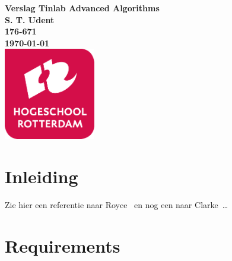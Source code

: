 \documentclass{article}
\begin{document}
\sffamily
\begin{titlepage}
  \centering
    \vfill
    {\bfseries\Huge
      Verslag Tinlab Advanced Algorithms \\
        \vskip2cm
      }
      {\bfseries\Large
        S. T. Udent\\
      }
      {
        \bfseries\normalsize
        176-671\\
        \vskip1cm
        \today\\
    }    
    \vfill
    \includegraphics[width=4cm]{logohr.png} %
    \vfill
    \vfill
\end{titlepage}
\newpage
\tableofcontents

\newpage
\section{Inleiding}
Zie hier een referentie naar Royce~\cite{royce1987managing} en nog een naar Clarke~\cite{modelchecking}\ldots 
\section{Requirements}
\end{document}
